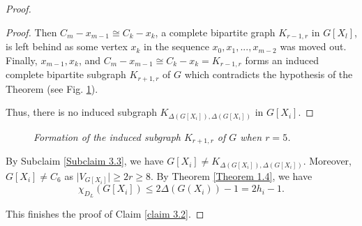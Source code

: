 \documentclass[12pt,reqno,a4paper]{amsart}
\theoremstyle{definition}
\begin{document}
\begin{proof}
\begin{enumerate}
\begin{proof}
\vspace{2mm}

Then $C_{m}-x_{m-1} \cong C_{k}-x_{k}$, a complete bipartite graph $K_{r-1,r}$ in $G[X_{l}]$, is left behind as some vertex $x_{k}$
in the sequence
$x_{0}, x_{1},..., x_{m-2}$
was moved out.
Finally, $x_{m-1}, x_{k}$, and $C_{m}-x_{m-1}\cong C_{k}-x_{k}=K_{r-1,r}$ forms an induced complete bipartite subgraph $K_{r+1,r}$ of $G$ which contradicts the hypothesis of the Theorem (see Fig. \ref{Figure 2}).
\vspace{2mm}

Thus, there is no induced subgraph $K_{\Delta(G[X_{i}]), \Delta(G[X_{i}])}$ in $G[X_{i}]$.
\end{proof}


\newcommand{\rsize}{5} %



\begin{figure}[h]
\centering


\caption{\em Formation of the induced subgraph $K_{r+1,r}$ of $G$ when $r=5$.}
\label{Figure 2}
\end{figure}

By Subclaim \ref{Subclaim 3.3}, we have $G[X_{i}]\neq K_{\Delta(G[X_{i}]), \Delta(G[X_{i}])}$. 
Moreover, $G[X_{i}]\neq C_{6}$ as $\vert V_{G[X_{i}]}\vert\geq 2r\geq 8$.
By Theorem \ref{Theorem 1.4}, we have
\[\chi_{D_{L}}(G[X_{i}])\leq 2\Delta(G(X_{i}))-1=2h_{i}-1.\]
\end{enumerate}
This finishes the proof of Claim \ref{claim 3.2}.
\end{proof}
\end{document}
